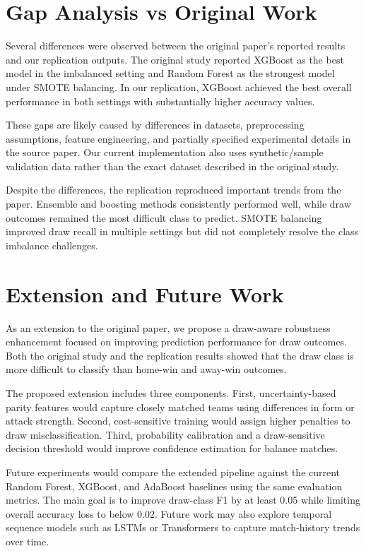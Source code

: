 \documentclass[11pt]{article}
\begin{document}
\section{Gap Analysis vs Original Work}

Several differences were observed between the original paper’s reported results and our replication outputs. The original study reported XGBoost as the best model in the imbalanced setting and Random Forest as the strongest model under SMOTE balancing. In our replication, XGBoost achieved the best overall performance in both settings with substantially higher accuracy values. 

These gaps are likely caused by differences in datasets, preprocessing assumptions, feature engineering, and partially specified experimental details in the source paper. Our current implementation also uses synthetic/sample validation data rather than the exact dataset described in the original study. 

Despite the differences, the replication reproduced important trends from the paper. Ensemble and boosting methods consistently performed well, while draw outcomes remained the most difficult class to predict. SMOTE balancing improved draw recall in multiple settings but did not completely resolve the class imbalance challenges.


\section{Extension and Future Work}

As an extension to the original paper, we propose a draw-aware robustness enhancement focused on improving prediction performance for draw outcomes. Both the original study and the replication results showed that the draw class is more difficult to classify than home-win and away-win outcomes.

The proposed extension includes three components. First, uncertainty-based parity features would capture closely matched teams using differences in form or attack strength. Second, cost-sensitive training would assign higher penalties to draw misclassification. Third, probability calibration and a draw-sensitive decision threshold would improve confidence estimation for balance matches. 

Future experiments would compare the extended pipeline against the current Random Forest, XGBoost, and AdaBoost baselines using the same evaluation metrics. The main goal is to improve draw-class F1 by at least 0.05 while limiting overall accuracy loss to below 0.02. Future work may also explore temporal sequence models such as LSTMs or Transformers to capture match-history trends over time.
\end{document}

